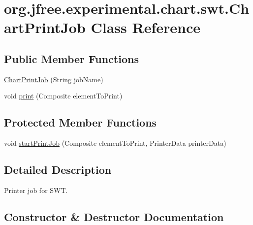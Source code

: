 \hypertarget{classorg_1_1jfree_1_1experimental_1_1chart_1_1swt_1_1_chart_print_job}{}\section{org.\+jfree.\+experimental.\+chart.\+swt.\+Chart\+Print\+Job Class Reference}
\label{classorg_1_1jfree_1_1experimental_1_1chart_1_1swt_1_1_chart_print_job}
\subsection*{Public Member Functions}
\begin{DoxyCompactItemize}
\item 
\mbox{\hyperlink{classorg_1_1jfree_1_1experimental_1_1chart_1_1swt_1_1_chart_print_job_a63b2c3b6c70ae244d174212ddc443457}{Chart\+Print\+Job}} (String job\+Name)
\item 
void \mbox{\hyperlink{classorg_1_1jfree_1_1experimental_1_1chart_1_1swt_1_1_chart_print_job_a8aee6fa02c4645b1daea7ddd8a610c74}{print}} (Composite element\+To\+Print)
\end{DoxyCompactItemize}
\subsection*{Protected Member Functions}
\begin{DoxyCompactItemize}
\item 
void \mbox{\hyperlink{classorg_1_1jfree_1_1experimental_1_1chart_1_1swt_1_1_chart_print_job_a69732939a8ad62df50f3789eb058b5f5}{start\+Print\+Job}} (Composite element\+To\+Print, Printer\+Data printer\+Data)
\end{DoxyCompactItemize}


\subsection{Detailed Description}
Printer job for S\+WT. 

\subsection{Constructor \& Destructor Documentation}
\mbox{\label{classorg_1_1jfree_1_1experimental_1_1chart_1_1swt_1_1_chart_print_job_a63b2c3b6c70ae244d174212ddc443457}} 
